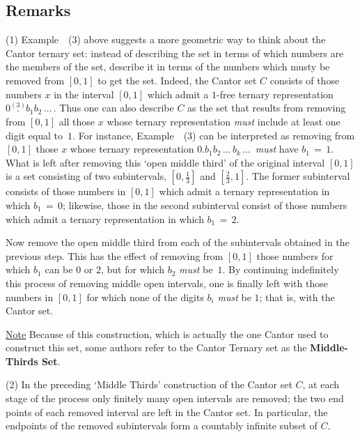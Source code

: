 {\V
\V

            \subsection{\small{\bf Remarks}}
            \label{RemrkA20.125}

\V

        \hspace*{\parindent}(1) Example~~(3) above suggests a more geometric way to think about the Cantor ternary set:
    instead of describing the set in terms of which numbers are the members of the set,
    describe it in terms of the numbers which musty be removed from $[0,1]$ to get the set.
    Indeed, the Cantor set $C$ consists of those numbers $x$ in the interval $[0,1]$ which admit a $1$-free ternary representation $0\stackrel{(3)}{.}b_{1}b_{2}\,{\ldots}\,$.
    Thus one can also describe $C$ as the set that results from removing from $[0,1]$ all those $x$ whose ternary representation {\em must} include at least one digit equal to~$1$.
    For instance, Example~~(3) can be interpreted as removing from $[0,1]$ those $x$ whose ternary representation 
    $0.b_{1}b_{2}\,{\ldots}\,b_{k}\,{\ldots}\,$ {\em must} have $b_{1} \,=\, 1$.
    What is left after removing this `open middle third' of the original interval $[0,1]$ is a set consisting of two subintervals, $[0,\frac{1}{3}]$ and $[\frac{2}{3},1]$.
    The former subinterval consists of those numbers in $[0,1]$ which admit a ternary representation in which $b_{1} \,=\, 0$;
    likewise, those in the second subinterval consist of those numbers which admit a ternary representation in which $b_{1} \,=\, 2$.

       Now remove the open middle third from each of the subintervals obtained in the previous step.
    This has the effect of removing from $[0,1]$ those numbers for which $b_{1}$ can be $0$ or $2$, but for which $b_{2}$ {\em must} be~$1$.
    By continuing indefinitely this process of removing middle open intervals, 
    one is finally left with those numbers in $[0,1]$ for which none of the digits $b_{i}$ {\em must} be $1$; that is, with the Cantor set.

        \underline{Note} Because of this construction, which is actually the one Cantor used to construct this set,
    some authors refer to the Cantor Ternary set as the {\bf Middle-Thirds Set}.

\V

        (2) In the preceding `Middle Thirds' construction of the Cantor set $C$, at each stage of the process only finitely many open intervals are removed;
    the two end points of each removed interval are left in the Cantor set.
    In particular, the endpoints of the removed subintervals form a countably infinite subset of $C$.

}
